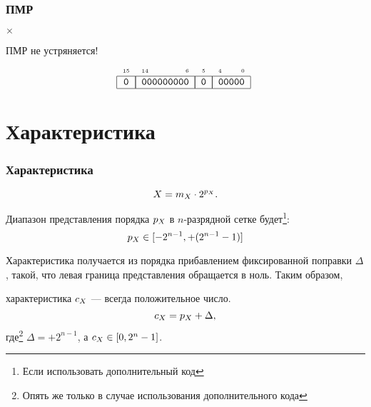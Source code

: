 \begin{frame}
    \frametitle{ПМР}

    \begin{center}
         $\times$
    \end{center}
    
    
    ПМР не устряняется!
    \[
        \FloatMyHex{0}{000000000}{0}{00000}
    \]
\end{frame}

    
\section{Характеристика}


\begin{frame}
    \frametitle{Характеристика}

    \[
        X = m_{X}\cdot {2}^{p_{X}}.
    \]
    
    Диапазон представления порядка $p_{X}$ в $n$-разрядной сетке будет\footnote{Если использовать дополнительный код}:
    \[
        p_{X}\in[-2^{n-1}, +(2^{n-1}-1)]
    \]
    
    Характеристика получается из порядка прибавлением фиксированной поправки $\Delta$, такой, что левая граница представления обращается в ноль. Таким образом, 
    \begin{block}{}
        характеристика $c_{X}$ --- всегда положительное число.
        \begin{equation}
            c_{X} = p_{X} + \Delta,
            \label{add:fpt:char}
        \end{equation}
        где\footnote{Опять же только в случае использования дополнительного кода} $\Delta=+2^{n-1}$, а $c_{X}\in[0,2^n-1]$.
    \end{block}
\end{frame}

